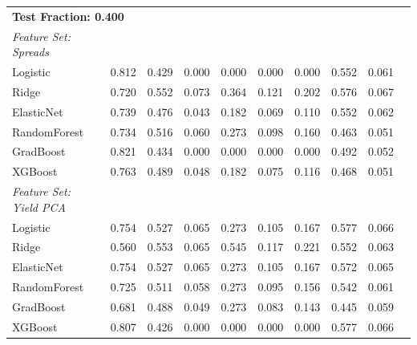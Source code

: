 \begin{longtable}{lccccccccc}
\midrule
\multicolumn{9}{l}{\textbf{Test Fraction: 0.400}} \\
\textit{Feature Set: Spreads} \\
\midrule
Logistic     & 0.812 & 0.429 & 0.000 & 0.000 & 0.000 & 0.000 & 0.552 & 0.061 \\
Ridge        & 0.720 & 0.552 & 0.073 & 0.364 & 0.121 & 0.202 & 0.576 & 0.067 \\
ElasticNet   & 0.739 & 0.476 & 0.043 & 0.182 & 0.069 & 0.110 & 0.552 & 0.062 \\
RandomForest & 0.734 & 0.516 & 0.060 & 0.273 & 0.098 & 0.160 & 0.463 & 0.051 \\
GradBoost    & 0.821 & 0.434 & 0.000 & 0.000 & 0.000 & 0.000 & 0.492 & 0.052 \\
XGBoost      & 0.763 & 0.489 & 0.048 & 0.182 & 0.075 & 0.116 & 0.468 & 0.051 \\
\addlinespace
\textit{Feature Set: Yield PCA} \\
\midrule
Logistic     & 0.754 & 0.527 & 0.065 & 0.273 & 0.105 & 0.167 & 0.577 & 0.066 \\
Ridge        & 0.560 & 0.553 & 0.065 & 0.545 & 0.117 & 0.221 & 0.552 & 0.063 \\
ElasticNet   & 0.754 & 0.527 & 0.065 & 0.273 & 0.105 & 0.167 & 0.572 & 0.065 \\
RandomForest & 0.725 & 0.511 & 0.058 & 0.273 & 0.095 & 0.156 & 0.542 & 0.061 \\
GradBoost    & 0.681 & 0.488 & 0.049 & 0.273 & 0.083 & 0.143 & 0.445 & 0.059 \\
XGBoost      & 0.807 & 0.426 & 0.000 & 0.000 & 0.000 & 0.000 & 0.577 & 0.066 \\
\end{longtable}